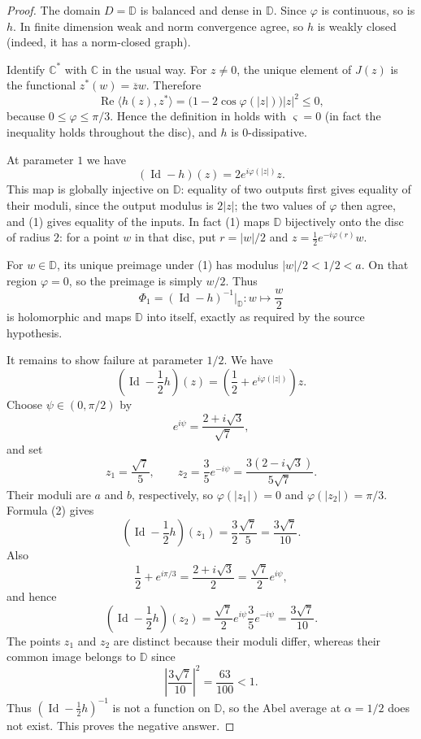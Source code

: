 \documentclass[11pt]{article}
\newcommand{\B}{\mathbb D}
\newcommand{\Id}{\operatorname{Id}}
\begin{document}
\begin{proof}
The domain $D=\B$ is balanced and dense in $\B$.  Since $\varphi$ is
continuous, so is $h$.  In finite dimension weak and norm convergence agree,
so $h$ is weakly closed (indeed, it has a norm-closed graph).

Identify $\mathbb C^*$ with $\mathbb C$ in the usual way.  For $z\ne0$, the
unique element of $J(z)$ is the functional $z^*(w)=\overline z w$.  Therefore
\[
\operatorname{Re}\langle h(z),z^*\rangle
=\bigl(1-2\cos\varphi(|z|)\bigr)|z|^2\le0,
\]
because $0\le\varphi\le\pi/3$.  Hence the definition in \cite{BKS} holds
with $\varsigma=0$ (in fact the inequality holds throughout the disc), and
$h$ is $0$-dissipative.

At parameter $1$ we have
\[
  (\Id-h)(z)=2e^{i\varphi(|z|)}z.                 \tag{1}
\]
This map is globally injective on $\B$: equality of two outputs first gives
equality of their moduli, since the output modulus is $2|z|$; the two values
of $\varphi$ then agree, and (1) gives equality of the inputs.  In fact (1)
maps $\B$ bijectively onto the disc of radius $2$: for a point $w$ in that
disc, put $r=|w|/2$ and $z=\tfrac12e^{-i\varphi(r)}w$.

For $w\in\B$, its unique preimage under (1) has modulus $|w|/2<1/2<a$.
On that region $\varphi=0$, so the preimage is simply $w/2$.  Thus
\[
  \Phi_1=(\Id-h)^{-1}\big|_{\B}:w\longmapsto\frac w2
\]
is holomorphic and maps $\B$ into itself, exactly as required by the source
hypothesis.

It remains to show failure at parameter $1/2$.  We have
\[
  \left(\Id-\frac12h\right)(z)
  =\left(\frac12+e^{i\varphi(|z|)}\right)z.       \tag{2}
\]
Choose $\psi\in(0,\pi/2)$ by
\[
  e^{i\psi}=\frac{2+i\sqrt3}{\sqrt7},
\]
and set
\[
  z_1=\frac{\sqrt7}{5},\qquad
  z_2=\frac35e^{-i\psi}
      =\frac{3(2-i\sqrt3)}{5\sqrt7}.
\]
Their moduli are $a$ and $b$, respectively, so
$\varphi(|z_1|)=0$ and $\varphi(|z_2|)=\pi/3$.  Formula (2) gives
\[
\left(\Id-\frac12h\right)(z_1)
=\frac32\frac{\sqrt7}{5}
=\frac{3\sqrt7}{10}.
\]
Also
\[
  \frac12+e^{i\pi/3}
  =\frac{2+i\sqrt3}{2}
  =\frac{\sqrt7}{2}e^{i\psi},
\]
and hence
\[
\left(\Id-\frac12h\right)(z_2)
=\frac{\sqrt7}{2}e^{i\psi}\frac35e^{-i\psi}
=\frac{3\sqrt7}{10}.
\]
The points $z_1$ and $z_2$ are distinct because their moduli differ, whereas
their common image belongs to $\B$ since
\[
  \left|\frac{3\sqrt7}{10}\right|^2=\frac{63}{100}<1.
\]
Thus $(\Id-\tfrac12h)^{-1}$ is not a function on $\B$, so the Abel average
at $\alpha=1/2$ does not exist.  This proves the negative answer.
\end{proof}
\end{document}
